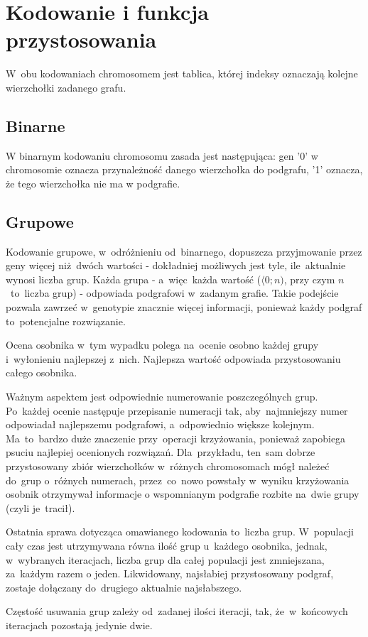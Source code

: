 \documentclass[11pt]{aghdpl}
\begin{document}
\chapter{Kodowanie i funkcja przystosowania}
\label{cha:encoding}
W~obu kodowaniach chromosomem jest tablica, której indeksy oznaczają kolejne wierzchołki zadanego grafu.
\section{Binarne}
\label{sec:binary}
W binarnym kodowaniu chromosomu zasada jest następująca: gen '0' w chromosomie oznacza przynależność danego wierzchołka 
do podgrafu, '1' oznacza, że tego wierzchołka nie ma w podgrafie.
\section{Grupowe}
\label{sec:group}
Kodowanie grupowe, w~odróżnieniu od~binarnego, dopuszcza przyjmowanie przez geny więcej niż~dwóch wartości - dokładniej możliwych 
jest tyle, ile~aktualnie wynosi liczba grup. Każda grupa - a~więc~każda wartość ($\langle0; n)$, przy czym $n$~to~liczba grup) - odpowiada 
podgrafowi w~zadanym grafie. Takie podejście pozwala zawrzeć w~genotypie znacznie więcej informacji, ponieważ każdy podgraf to~potencjalne 
rozwiązanie. 

Ocena osobnika w~tym wypadku polega na~ocenie osobno każdej grupy i~wyłonieniu najlepszej z~nich. Najlepsza wartość odpowiada przystosowaniu 
całego osobnika.

Ważnym aspektem jest odpowiednie numerowanie poszczególnych grup. Po~każdej ocenie następuje przepisanie numeracji tak, aby~najmniejszy
numer odpowiadał najlepszemu podgrafowi, a~odpowiednio większe kolejnym. Ma~to~bardzo duże znaczenie przy~operacji krzyżowania, ponieważ 
zapobiega psuciu najlepiej ocenionych rozwiązań. Dla~przykładu, ten~sam dobrze przystosowany zbiór wierzchołków w~różnych chromosomach mógł
należeć do~grup o~różnych numerach, przez~co~nowo powstały w~wyniku krzyżowania osobnik otrzymywał informacje o wspomnianym podgrafie rozbite
na~dwie grupy (czyli je~tracił).

Ostatnia sprawa dotycząca omawianego kodowania to~liczba grup. W~populacji cały czas jest utrzymywana równa ilość grup u~każdego osobnika, jednak,
w~wybranych iteracjach, liczba grup dla całej populacji jest zmniejszana, za~każdym razem o jeden. Likwidowany, najsłabiej przystosowany podgraf, 
zostaje dołączany do~drugiego aktualnie najsłabszego.

Częstość usuwania grup zależy od~zadanej ilości iteracji, tak, że~w~końcowych iteracjach pozostają jedynie dwie.
\end{document}
